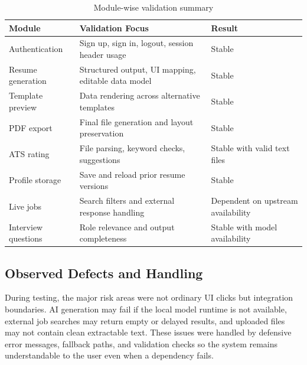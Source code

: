 \begin{table}[H]
\centering
\caption{Module-wise validation summary}
\begin{tabular}{|p{3.6cm}|p{5.7cm}|p{2.9cm}|}
\hline
\textbf{Module} & \textbf{Validation Focus} & \textbf{Result} \\
\hline
Authentication & Sign up, sign in, logout, session header usage & Stable \\
\hline
Resume generation & Structured output, UI mapping, editable data model & Stable \\
\hline
Template preview & Data rendering across alternative templates & Stable \\
\hline
PDF export & Final file generation and layout preservation & Stable \\
\hline
ATS rating & File parsing, keyword checks, suggestions & Stable with valid text files \\
\hline
Profile storage & Save and reload prior resume versions & Stable \\
\hline
Live jobs & Search filters and external response handling & Dependent on upstream availability \\
\hline
Interview questions & Role relevance and output completeness & Stable with model availability \\
\hline
\end{tabular}
\end{table}

\subsection{Observed Defects and Handling}
\noindent During testing, the major risk areas were not ordinary UI clicks but integration boundaries. AI generation may fail if the local model runtime is not available, external job searches may return empty or delayed results, and uploaded files may not contain clean extractable text. These issues were handled by defensive error messages, fallback paths, and validation checks so the system remains understandable to the user even when a dependency fails.

